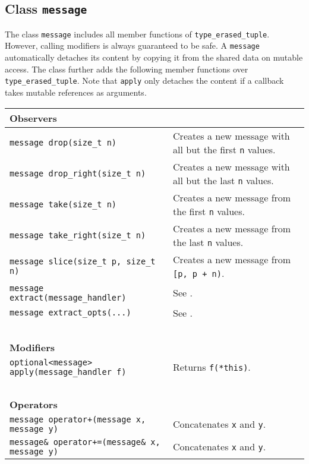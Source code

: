 \subsection{Class \lstinline^message^}

The class \lstinline^message^ includes all member functions of \lstinline^type_erased_tuple^. However, calling modifiers is always guaranteed to be safe. A \lstinline^message^ automatically detaches its content by copying it from the shared data on mutable access. The class further adds the following member functions over \lstinline^type_erased_tuple^. Note that \lstinline^apply^ only detaches the content if a callback takes mutable references as arguments.

\begin{center}\small
\begin{tabular}{ll}
  \textbf{Observers} & ~ \\
  \hline
  \lstinline^message drop(size_t n)^ & Creates a new message with all but the first \lstinline^n^ values. \\
  \hline
  \lstinline^message drop_right(size_t n)^ & Creates a new message with all but the last \lstinline^n^ values. \\
  \hline
  \lstinline^message take(size_t n)^ & Creates a new message from the first \lstinline^n^ values. \\
  \hline
  \lstinline^message take_right(size_t n)^ & Creates a new message from the last \lstinline^n^ values. \\
  \hline
  \lstinline^message slice(size_t p, size_t n)^ & Creates a new message from \lstinline^[p, p + n)^. \\
  \hline
  \lstinline^message extract(message_handler)^ & See . \\
  \hline
  \lstinline^message extract_opts(...)^ & See . \\
  \hline
  ~ & ~ \\ \textbf{Modifiers} & ~ \\
  \hline
  \lstinline^optional<message> apply(message_handler f)^ & Returns \lstinline^f(*this)^. \\
  \hline
  ~ & ~ \\ \textbf{Operators} & ~ \\
  \hline
  \lstinline^message operator+(message x, message y)^ & Concatenates \lstinline^x^ and \lstinline^y^. \\
  \hline
  \lstinline^message& operator+=(message& x, message y)^ & Concatenates \lstinline^x^ and \lstinline^y^. \\
  \hline
\end{tabular}
\end{center}

